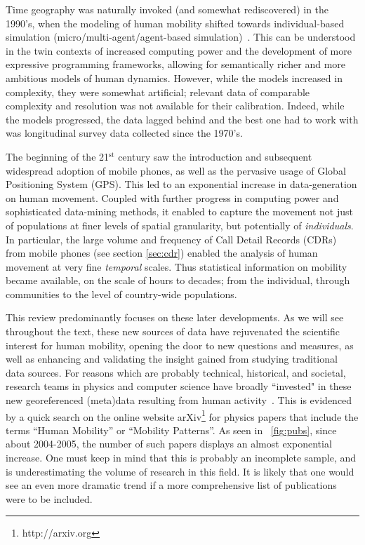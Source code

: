 Time geography was naturally invoked (and somewhat rediscovered) in the 1990's, when the modeling of human mobility shifted towards individual-based simulation (micro/multi-agent/agent-based simulation)~\cite{chardonnel_2007_time}. This can be understood in the twin contexts of increased computing power and the development of more expressive programming frameworks, allowing for semantically richer and more ambitious models of human dynamics. However, while the models increased in complexity, they were somewhat artificial;
relevant data of comparable complexity and resolution was not available for their calibration. Indeed, while the models progressed, the data lagged behind and the best one had to work with was longitudinal survey data collected since the 1970's. 

The beginning of the 21$^\text{st}$ century saw the introduction and subsequent widespread adoption of mobile phones, as well as the pervasive usage of Global Positioning System (GPS). This led to an exponential increase in data-generation on human movement. Coupled with further progress in computing power and sophisticated data-mining methods, it enabled to capture the movement not just of populations at finer levels of spatial granularity, but potentially of \emph{individuals}. In particular, the large volume and frequency of Call Detail Records (CDRs) from mobile phones (see section \ref{sec:cdr}) enabled the analysis of human movement at very fine \emph{temporal} scales. Thus statistical information on mobility became available, on the scale of hours to decades; from the individual, through communities to the level of country-wide populations.

\medskip

This review predominantly focuses on these later developments. As we will see throughout the text, these new sources of data have rejuvenated the scientific interest for human mobility, opening the door to new questions and measures, as well as enhancing and validating the insight gained from studying traditional data sources. For reasons which are probably technical, historical, and societal, research teams in physics and computer science have broadly ``invested" in these new georeferenced (meta)data resulting from human activity~\cite{osullivan_2015_do}. This is evidenced by a quick search on the online website arXiv\footnote{http://arxiv.org} for physics papers that include the terms ``Human Mobility'' or ``Mobility Patterns''. As seen in \figurename~\ref{fig:pubs}, since about 2004-2005, the number of such papers displays an almost exponential increase. One must keep in mind that this is probably an incomplete sample, and is underestimating the volume of research in this field. It is likely that one would see an even more dramatic trend if a more comprehensive list of publications %
were to be included.

